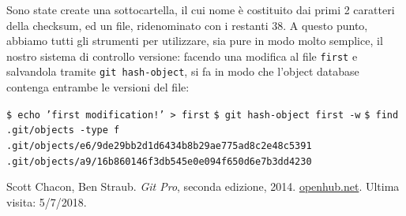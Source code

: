 \documentclass[12pt]{article}
\def\code#1{\texttt{#1}}
\begin{document}
Sono state create una sottocartella, il cui nome è costituito dai primi 2 caratteri della checksum, ed un file, ridenominato con i restanti 38.
A questo punto, abbiamo tutti gli strumenti per utilizzare, sia pure in modo molto semplice, il nostro sistema di controllo versione: facendo una modifica al file \code{first} e salvandola tramite \code{git hash-object}, si fa in modo che l'object database contenga entrambe le versioni del file:
\begin{algorithm*}
	\begin{algorithmic}
		\State \code{\$ echo 'first modification!' > first}
		\State \code{\$ git hash-object first -w}	
		\State \code{\$ find .git/objects -type f}
		\State \code{.git/objects/e6/9de29bb2d1d6434b8b29ae775ad8c2e48c5391}
		\State \code{.git/objects/a9/16b860146f3db545e0e094f650d6e7b3dd4230}
	\end{algorithmic}
\end{algorithm*}
\newpage
\begin{thebibliography}{9}
	Scott Chacon, Ben Straub. \textit{Git Pro}, seconda edizione, 2014.
	\url{openhub.net}. Ultima visita: 5/7/2018.
\end{thebibliography}
\end{document}
